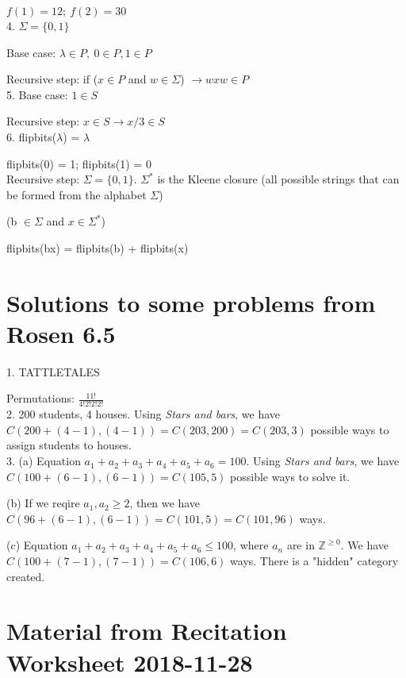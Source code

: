 \documentclass[english,openany]{book}
\begin{document}
    $f(1) = 12;\ f(2) = 30$\\

    4. $\Sigma = \{0,1\}$

    Base case: $\lambda \in P,\ 0 \in P, 1 \in P$

    Recursive step: if ($x \in P$ and $w \in \Sigma$) $\rightarrow wxw \in P$\\

    5. Base case: $1 \in S$

    Recursive step: $x \in S \rightarrow x/3 \in S$\\

    6. flipbits($\lambda$) = $\lambda$

    flipbits(0) = 1; flipbits(1) = 0\\

    Recursive step: $\Sigma = \{0,1\}$. $\Sigma^*$ is the Kleene closure (all possible strings that can be formed from the alphabet $\Sigma$)

    (b $\in \Sigma$ and $x \in \Sigma^*$)

    flipbits(bx) = flipbits(b) + flipbits(x)\\

    \section{Solutions to some problems from Rosen 6.5}

    1. TATTLETALES

    Permutations: $\frac{11!}{4!2!2!2!}$\\

    2. 200 students, 4 houses. Using \textit{Stars and bars}, we have $C(200+(4-1), (4-1)) = C(203, 200) = C(203, 3)$ possible ways to assign students to houses.\\

    3. (a) Equation $a_1 + a_2 + a_3 + a_4 + a_5 + a_6 = 100$. Using \textit{Stars and bars}, we have $C(100+(6-1), (6-1)) = C(105, 5)$ possible ways to solve it.

    (b) If we reqire $a_1, a_2 \geq 2$, then we have $C(96+(6-1), (6-1)) = C(101,5) = C(101, 96)$ ways.

    (c) Equation $a_1 + a_2 + a_3 + a_4 + a_5 + a_6 \leq 100$, where $a_n$ are in $\mathbb Z^{\geq 0}$. We have $C(100+(7-1), (7-1)) = C(106,6)$ ways. There is a "hidden" category created.\\

    \section{Material from Recitation Worksheet 2018-11-28}
\end{document}
